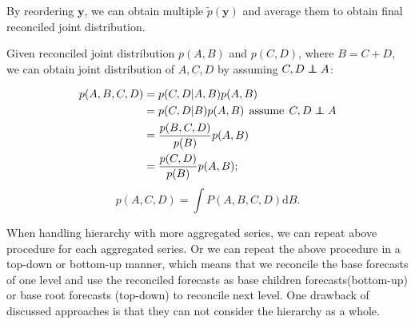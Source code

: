\documentclass{article}
\newcommand\independent{\protect\mathpalette{\protect\independenT}{\perp}}
\def\independenT#1#2{\mathrel{\rlap{$#1#2$}\mkern2mu{#1#2}}}
\begin{document}
   By reordering $\bm{y}$, we can obtain multiple $\tilde p(\bm{y})$ and average them to obtain final reconciled joint distribution.

  Given reconciled joint distribution $p(A, B)$ and $p(C,D)$, where $B=C+D$, we can obtain joint distribution of $A,C,D$ by assuming $C,D \independent{A}$:

  \[
      \begin{aligned}
        p(A,B,C,D) &= p(C, D|A,B)p(A,B) \\ 
          &= p(C,D|B)p(A,B)  \:\: \textrm{assume}\:\: C,D \independent {A}\\
          &= \frac{p(B,C,D)}{p(B)}p(A,B) \\
          &= \frac{p(C,D)}{p(B)}p(A,B);
     \end{aligned}
     \]
     \[
       p(A,C,D) = \int P(A,B,C,D) \textrm{d}B.
      \]


   When handling hierarchy with more aggregated series, we can repeat above procedure for each aggregated series. 
   Or we can repeat the above procedure in a top-down or bottom-up manner, which means that we reconcile the base forecasts of one level and use the reconciled forecasts as base children forecasts(bottom-up) or base root forecasts (top-down) to reconcile next level. One drawback of discussed approaches is that they can not consider the hierarchy as a whole.

    
    
\end{document}

